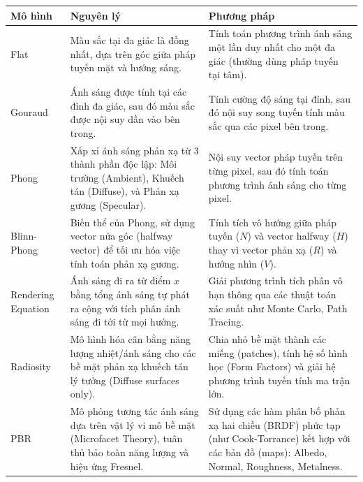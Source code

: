 \begin{table}[H]
	\centering
	\begin{tabular}{|l|p{6cm}|p{6cm}|}
		\hline
		\textbf{Mô hình} & \textbf{Nguyên lý} & \textbf{Phương pháp} \\ \hline
		Flat & Màu sắc tại đa giác là đồng nhất, dựa trên góc giữa pháp tuyến mặt và hướng sáng. & Tính toán phương trình ánh sáng một lần duy nhất cho một đa giác (thường dùng pháp tuyến tại tâm). \\ \hline
		Gouraud & Ánh sáng được tính tại các đỉnh đa giác, sau đó màu sắc được nội suy dần vào bên trong. & Tính cường độ sáng tại đỉnh, sau đó nội suy song tuyến tính màu sắc qua các pixel bên trong. \\ \hline
		Phong & Xấp xỉ ánh sáng phản xạ từ 3 thành phần độc lập: Môi trường (Ambient), Khuếch tán (Diffuse), và Phản xạ gương (Specular). & Nội suy vector pháp tuyến trên từng pixel, sau đó tính toán phương trình ánh sáng cho từng pixel. \\ \hline
		Blinn-Phong & Biến thể của Phong, sử dụng vector nửa góc (halfway vector) để tối ưu hóa việc tính toán phản xạ gương. & Tính tích vô hướng giữa pháp tuyến ($N$) và vector halfway ($H$) thay vì vector phản xạ ($R$) và hướng nhìn ($V$). \\ \hline
		Rendering Equation & Ánh sáng đi ra từ điểm $x$ bằng tổng ánh sáng tự phát ra cộng với tích phân ánh sáng đi tới từ mọi hướng. & Giải phương trình tích phân vô hạn thông qua các thuật toán xác suất như Monte Carlo, Path Tracing. \\ \hline
		Radiosity & Mô hình hóa cân bằng năng lượng nhiệt/ánh sáng cho các bề mặt phản xạ khuếch tán lý tưởng (Diffuse surfaces only). & Chia nhỏ bề mặt thành các miếng (patches), tính hệ số hình học (Form Factors) và giải hệ phương trình tuyến tính ma trận lớn. \\ \hline
		PBR & Mô phỏng tương tác ánh sáng dựa trên vật lý vi mô bề mặt (Microfacet Theory), tuân thủ bảo toàn năng lượng và hiệu ứng Fresnel. & Sử dụng các hàm phân bố phản xạ hai chiều (BRDF) phức tạp (như Cook-Torrance) kết hợp với các bản đồ (maps): Albedo, Normal, Roughness, Metalness. \\ \hline
	\end{tabular}
\end{table}

